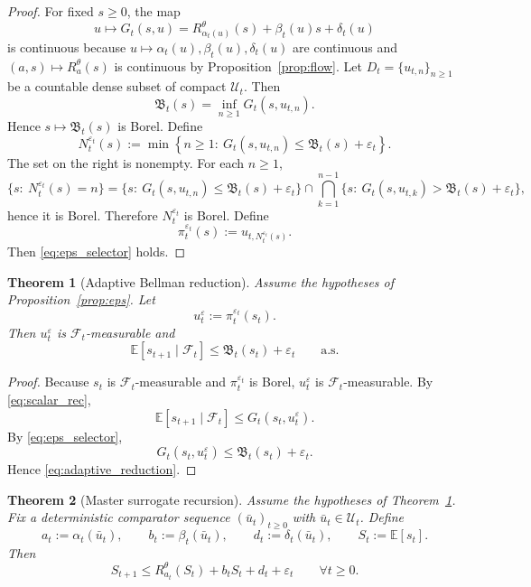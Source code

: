 \documentclass{article}
\newtheorem{theorem}{Theorem}[section]
\theoremstyle{definition}
\begin{document}
\begin{proof}
For fixed $s\ge 0$, the map
\[
u\mapsto G_t(s,u)=R_{\alpha_t(u)}^\theta(s)+\beta_t(u)s+\delta_t(u)
\]
is continuous because $u\mapsto \alpha_t(u),\beta_t(u),\delta_t(u)$ are continuous and $(a,s)\mapsto R_a^\theta(s)$ is continuous by Proposition~\ref{prop:flow}.
Let $D_t=\{u_{t,n}\}_{n\ge 1}$ be a countable dense subset of compact $\mathcal U_t$.
Then
\[
\mathfrak B_t(s)=\inf_{n\ge 1}G_t(s,u_{t,n}).
\]
Hence $s\mapsto \mathfrak B_t(s)$ is Borel.
Define
\[
N_t^{\varepsilon_t}(s)
:=
\min\left\{
n\ge 1:\ G_t(s,u_{t,n})\le \mathfrak B_t(s)+\varepsilon_t
\right\}.
\]
The set on the right is nonempty.
For each $n\ge 1$,
\[
\{s:\ N_t^{\varepsilon_t}(s)=n\}
=
\{s:\ G_t(s,u_{t,n})\le \mathfrak B_t(s)+\varepsilon_t\}
\cap
\bigcap_{k=1}^{n-1}
\{s:\ G_t(s,u_{t,k})>\mathfrak B_t(s)+\varepsilon_t\},
\]
hence it is Borel.
Therefore $N_t^{\varepsilon_t}$ is Borel.
Define
\[
\pi_t^{\varepsilon_t}(s):=u_{t,N_t^{\varepsilon_t}(s)}.
\]
Then \eqref{eq:eps_selector} holds.
\end{proof}

\begin{theorem}[Adaptive Bellman reduction]
\label{thm:adaptive}
Assume the hypotheses of Proposition~\ref{prop:eps}.
Let
\[
u_t^\varepsilon:=\pi_t^{\varepsilon_t}(s_t).
\]
Then $u_t^\varepsilon$ is $\mathcal F_t$-measurable and
\begin{equation}
\mathbb E[s_{t+1}\mid\mathcal F_t]
\le
\mathfrak B_t(s_t)+\varepsilon_t
\qquad
\text{a.s.}
\label{eq:adaptive_reduction}
\end{equation}
\end{theorem}

\begin{proof}
Because $s_t$ is $\mathcal F_t$-measurable and $\pi_t^{\varepsilon_t}$ is Borel, $u_t^\varepsilon$ is $\mathcal F_t$-measurable.
By \eqref{eq:scalar_rec},
\[
\mathbb E[s_{t+1}\mid\mathcal F_t]\le G_t(s_t,u_t^\varepsilon).
\]
By \eqref{eq:eps_selector},
\[
G_t(s_t,u_t^\varepsilon)\le \mathfrak B_t(s_t)+\varepsilon_t.
\]
Hence \eqref{eq:adaptive_reduction}.
\end{proof}

\begin{theorem}[Master surrogate recursion]
\label{thm:master}
Assume the hypotheses of Theorem~\ref{thm:adaptive}.
Fix a deterministic comparator sequence $(\bar u_t)_{t\ge 0}$ with $\bar u_t\in\mathcal U_t$.
Define
\begin{equation*}
a_t:=\alpha_t(\bar u_t),
\qquad
b_t:=\beta_t(\bar u_t),
\qquad
d_t:=\delta_t(\bar u_t),
\qquad
S_t:=\mathbb E[s_t].
\end{equation*}
Then
\begin{equation}
S_{t+1}
\le
R_{a_t}^\theta(S_t)+b_tS_t+d_t+\varepsilon_t
\qquad
\forall t\ge 0.
\label{eq:master_rec}
\end{equation}
\end{theorem}
\end{document}
